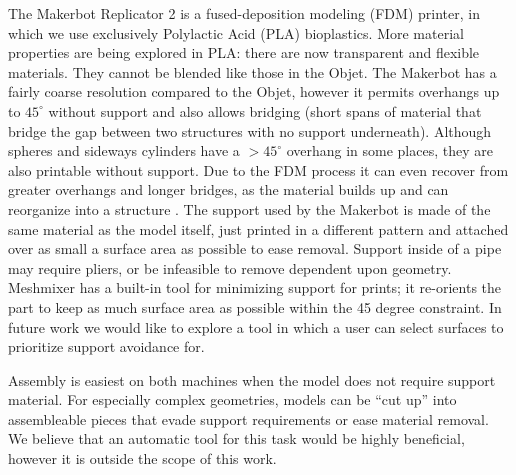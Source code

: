 The Makerbot Replicator 2 is a fused-deposition modeling (FDM) printer, in which we use exclusively Polylactic Acid (PLA) bioplastics.  More material properties are being explored in PLA: there are now transparent and flexible materials.  They cannot be blended like those in the Objet.  The Makerbot has a fairly coarse resolution compared to the Objet, however it permits overhangs up to $45^{\circ}$ without support and also allows bridging (short spans of material that bridge the gap between two structures with no support underneath).  Although spheres and sideways cylinders have a $>45^{\circ}$ overhang in some places, they are also printable without support.  Due to the FDM process it can even recover from greater overhangs and longer bridges, as the material builds up and can reorganize into a structure .  The support used by the Makerbot is made of the same material as the model itself, just printed in a different pattern and attached over as small a surface area as possible to ease removal.  Support inside of a pipe may require pliers, or be infeasible to remove dependent upon geometry.  Meshmixer has a built-in tool for minimizing support for prints; it re-orients the part to keep as much surface area as possible within the 45 degree constraint.  In future work we would like to explore a tool in which a user can select surfaces to prioritize support avoidance for.

Assembly is easiest on both machines when the model does not require support material.  For especially complex geometries, models can be ``cut up''  into assembleable pieces that evade support requirements or ease material removal.  We believe that an automatic tool for this task would be highly beneficial, however it is outside the scope of this work.